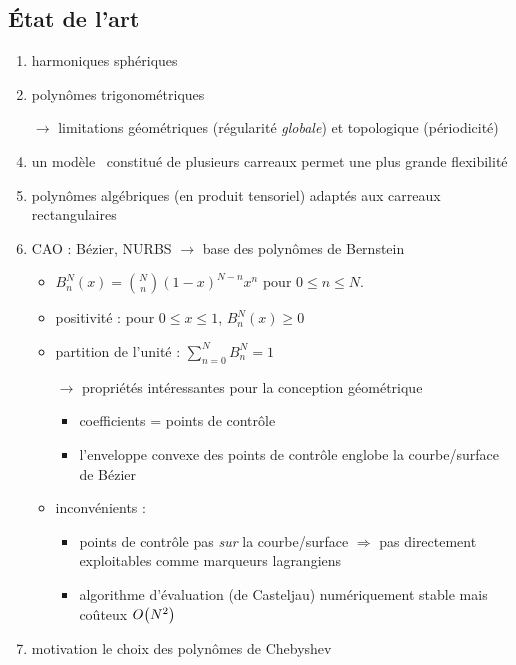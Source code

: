 \subsection{État de l'art}
\begin{enumerate}
	\item harmoniques sphériques \cite{rahimian2015}
	\item polynômes trigonométriques \cite{gueyffier2015}
	\item[$\to$] limitations géométriques (régularité \textit{globale}) et topologique (périodicité)
	\item un modèle \brep\ constitué de plusieurs carreaux permet une plus grande flexibilité
	\item polynômes algébriques (en produit tensoriel) adaptés aux carreaux rectangulaires
	\item CAO : Bézier, NURBS $\to$ base des polynômes de Bernstein
	\begin{itemize}
		\item $B_n^N(x) = \binom{N}{n} \left( 1 - x \right)^{N-n} x^n$ pour $0 \leq n \leq N$.
		\item positivité : pour $0 \leq x \leq 1$, $B_n^N(x) \geq 0$
		\item partition de l'unité : $\sum_{n = 0}^N B_n^N = 1$
		\item[$\to$] propriétés intéressantes pour la conception géométrique
		\begin{itemize}
			\item coefficients = points de contrôle
			\item l'enveloppe convexe des points de contrôle englobe la courbe/surface de Bézier
		\end{itemize}
		\item inconvénients :
		\begin{itemize}
			\item points de contrôle pas \emph{sur} la courbe/surface $\Rightarrow$ pas directement exploitables comme marqueurs lagrangiens
			\item algorithme d'évaluation (de Casteljau) numériquement stable mais coûteux $O\!\left( {N^2} \right)$
		\end{itemize}
	\end{itemize}
	\item motivation le choix des polynômes de Chebyshev
\end{enumerate}


